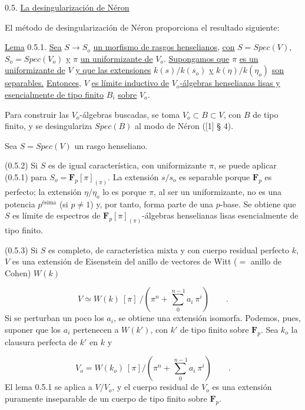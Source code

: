 0.5.  \underline{La desingularización de Néron}

El método de desingularización de Néron proporciona el resultado siguiente:

\underline{Lema} 0.5.1.  \underline{Sea} $S \longrightarrow S_o$ \underline{un morfismo de rasgos henselianos,} \underline{con} $S = Spec(V)$, $S_o = Spec(V_o)$ \underline{y} $\pi$ \underline{un uniformizante de} $V_o$. \underline{Supongamos que} $\pi$ \underline{es un uniformizante de} $V$ \underline{y que las extensiones} $k(s)/k(s_o)$ \underline{y} $k(\eta)/k(\eta_o)$ \underline{son separables.} \underline{Entonces,} $V$ \underline{es límite inductivo de} $V_o$\underline{-álgebras henselianas lisas y esencialmente de tipo finito} $B_i$ \underline{sobre} $V_o$.



Para construir las $V_o$-álgebras buscadas, se toma $V_o \subset B \subset V$, con $B$ de tipo finito, y se desingulariza $Spec(B)$ al modo de Néron ([1] § 4).

Sea $S = Spec(V)$ un rasgo henseliano.

(0.5.2)  Si $S$ es de igual característica, con uniformizante $\pi$, se puede aplicar (0.5.1) para $S_o = \mathbf{F}_p[\pi]_{(\pi)}$. La extensión $s/s_o$ es separable porque $\mathbf{F}_p$ es perfecto; la extensión $\eta/\eta_o$ lo es porque $\pi$, al ser un uniformizante, no es una potencia $p^{\text{ésima}}$ (si $p \neq 1$) y, por tanto, forma parte de una $p$-base. Se obtiene que $S$ es límite de espectros de $\mathbf{F}_p[\pi]_{(\pi)}$-álgebras henselianas lisas esencialmente de tipo finito.

(0.5.3)  Si $S$ es completo, de característica mixta y con cuerpo residual perfecto $k$, $V$ es una extensión de Eisenstein del anillo de vectores de Witt ($=$ anillo de Cohen) $W(k)$

\begin{equation*}
V \simeq W(k) \ [\pi] \ /(\pi^n + \sum_0^{\,n-1} a_i \ \pi^i) \qquad .
\end{equation*}
Si se perturban un poco los $a_i$, se obtiene una extensión isomorfa. Podemos, pues, suponer que los $a_i$ pertenecen a $W(k')$, con $k'$ de tipo finito sobre $\mathbf{F}_p$. Sea $k_o$ la clausura perfecta de $k'$ en $k$ y

\begin{equation*}
V_o = W(k_o) \ [\pi]/(\pi^n + \sum_0^{\,n-1} a_i \ \pi^i) \qquad .
\end{equation*}
El lema 0.5.1 se aplica a $V/V_o$, y el cuerpo residual de $V_o$ es una extensión puramente inseparable de un cuerpo de tipo finito sobre $\mathbf{F}_p$.


